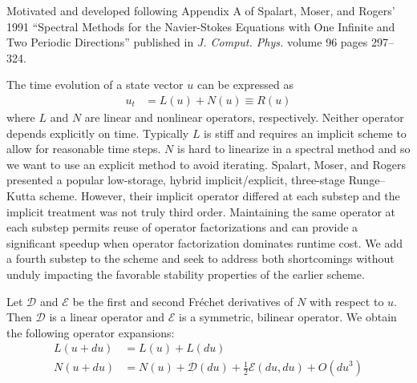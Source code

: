\documentclass[letterpaper,11pt]{amsart}
\newcommand{\order}[2]{\ensuremath{O\!\left( {#1}^{#2} \right)}}
\begin{document}
Motivated and developed following Appendix A of Spalart, Moser, and
Rogers' 1991 ``Spectral Methods for the Navier-Stokes Equations
with One Infinite and Two Periodic Directions'' published in
\emph{J. Comput. Phys.} volume 96 pages 297--324.

The time evolution of a state vector $u$ can be expressed as
\begin{align}
  u_{t}
  &=
  L(u)
  +
  N(u)
  \equiv
  R(u)
\end{align}
where $L$ and $N$ are linear and nonlinear operators, respectively.  Neither
operator depends explicitly on time.  Typically $L$ is stiff and requires an
implicit scheme to allow for reasonable time steps.  $N$ is hard to linearize
in a spectral method and so we want to use an explicit method to avoid
iterating.  Spalart, Moser, and Rogers presented a popular low-storage, hybrid
implicit/explicit, three-stage Runge--Kutta scheme.  However, their implicit
operator differed at each substep and the implicit treatment was not truly
third order.  Maintaining the same operator at each substep permits reuse of
operator factorizations and can provide a significant speedup when operator
factorization dominates runtime cost.  We add a fourth substep to the scheme
and seek to address both shortcomings without unduly impacting the favorable
stability properties of the earlier scheme.

Let $\mathcal{D}$ and $\mathcal{E}$ be the first and second
Fr\'echet derivatives of $N$ with respect to $u$.  Then
$\mathcal{D}$ is a linear operator and $\mathcal{E}$ is a symmetric,
bilinear operator.  We obtain the following operator expansions:
\begin{subequations}
\begin{align}
  L(u+du)
  &=
  L(u)
  +
  L(du)
\\
  N(u+du)
  &=
  N(u)
  +
  \mathcal{D}(du)
  +
  \frac{1}{2}\mathcal{E}(du,du)
  +
  \order{du}{3}
\end{align}
\end{subequations}
\end{document}
